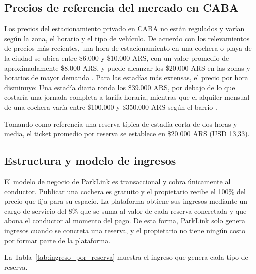 \subsection{Precios de referencia del mercado en CABA}

Los precios del estacionamiento privado en CABA no están regulados y varían según la zona, el horario y el tipo de vehículo. De acuerdo con los relevamientos de precios más recientes, una hora de estacionamiento en una cochera o playa de la ciudad se ubica entre \$6.000 y \$10.000 ARS, con un valor promedio de aproximadamente \$8.000 ARS, y puede alcanzar los \$20.000 ARS en las zonas y horarios de mayor demanda \autocite{iprofesional2026cocheras}. Para las estadías más extensas, el precio por hora disminuye: Una estadía diaria ronda los \$39.000 ARS, por debajo de lo que costaría una jornada completa a tarifa horaria, mientras que el alquiler mensual de una cochera varía entre \$100.000 y \$350.000 ARS según el barrio \autocite{iprofesional2026cocheras, lanacion2026cocheras}.

Tomando como referencia una reserva típica de estadía corta de dos horas y media, el ticket promedio por reserva se establece en \$20.000 ARS (USD 13,33).

\subsection{Estructura y modelo de ingresos}

El modelo de negocio de ParkLink es transaccional y cobra únicamente al conductor. Publicar una cochera es gratuito y el propietario recibe el 100\% del precio que fija para su espacio. La plataforma obtiene sus ingresos mediante un cargo de servicio del 8\% que se suma al valor de cada reserva concretada y que abona el conductor al momento del pago. De esta forma, ParkLink solo genera ingresos cuando se concreta una reserva, y el propietario no tiene ningún costo por formar parte de la plataforma.

La Tabla~\ref{tab:ingreso_por_reserva} muestra el ingreso que genera cada tipo de reserva.


